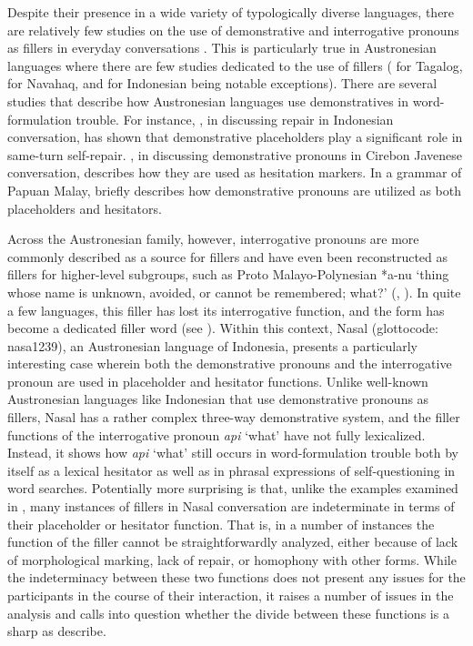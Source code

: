 \documentclass[output=paper,colorlinks,citecolor=brown
\ChapterDOI{10.5281/zenodo.15697585}
]{langscibook}
\begin{document}
Despite their presence in a wide variety of typologically diverse languages, there are relatively few studies on the use of demonstrative and interrogative pronouns as fillers in everyday conversations \citep[see][58]{hayashi2010crosslinguistic}. This is particularly true in Austronesian languages where there are few studies dedicated to the use of fillers (\cite{nagaya2022tagalog} for Tagalog, \cite{dimock2010fillers} for Navahaq, and \cite{williams2010toward} for Indonesian being notable exceptions). There are several studies that describe how Austronesian languages use demonstratives in word-formulation trouble. For instance, \citet{wouk2005syntax}, in discussing repair in Indonesian conversation, has shown that demonstrative placeholders play a significant role in same-turn self-repair. \citet{ewing2005grammar}, in discussing demonstrative pronouns in Cirebon Javenese conversation, describes how they are used as hesitation markers. In a grammar of Papuan Malay, \citet{Kluge2017} briefly describes how demonstrative pronouns are utilized as both placeholders and hesitators. 

Across the Austronesian family, however, interrogative pronouns are more commonly described as a source for fillers and have even been reconstructed as fillers for higher-level subgroups, such as Proto Malayo-Polynesian *a-nu `thing whose name is unknown, avoided, or cannot be remembered; what?' (\cite[516]{blust2013austronesian}, \cite{blust2023acd}). In quite a few languages, this filler has lost its interrogative function, and the form has become a dedicated filler word (see \cite{chapters/mcdonnell_billings}). Within this context, Nasal (glottocode: nasa1239), an Austronesian language of Indonesia, presents a particularly interesting case wherein both the demonstrative pronouns and the interrogative pronoun are used in placeholder and hesitator functions. Unlike well-known Austronesian languages like Indonesian that use demonstrative pronouns as fillers, Nasal has a rather complex three-way demonstrative system, and the filler functions of the interrogative pronoun \textit{api} `what' have not fully lexicalized. Instead, it shows how \textit{api} `what' still occurs in word-formulation trouble both by itself as a lexical hesitator as well as in phrasal expressions of self-questioning in word searches. Potentially more surprising is that, unlike the examples examined in \citet{hayashi2006crosslinguistic}, many instances of fillers in Nasal conversation are indeterminate in terms of their placeholder or hesitator function. That is, in a number of instances the function of the filler cannot be straightforwardly analyzed, either because of lack of morphological marking, lack of repair, or homophony with other forms. While the indeterminacy between these two functions does not present any issues for the participants in the course of their interaction, it raises a number of issues in the analysis and calls into question whether the divide between these functions is a sharp as \citet{hayashi2006crosslinguistic} describe.
\end{document}
